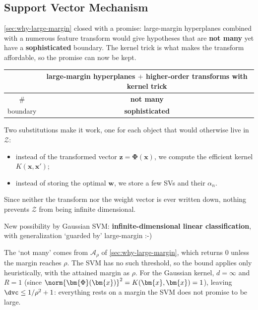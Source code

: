 \subsection{Support Vector Mechanism}

\autoref{sec:why-large-margin} closed with a promise: large-margin
hyperplanes combined with a numerous feature transform would give
hypotheses that are \textbf{not many} yet have a \textbf{sophisticated}
boundary. The kernel trick is what makes the transform affordable, so the
promise can now be kept.

\begin{center}
    \solidrules
    \begin{tabular}{c|c}
        \toprule
        & large-margin hyperplanes \(+\) higher-order transforms with
            kernel trick\\
        \midrule
        \# & \textbf{not many}\\
        boundary & \textbf{sophisticated}\\
        \bottomrule
    \end{tabular}
\end{center}

Two substitutions make it work, one for each object that would otherwise
live in \(\mathcal{Z}\):
\begin{itemize}
    \item instead of the transformed vector \(\bm{z} = \bm{\Phi}(\bm{x})\),
        we compute the efficient kernel \(K(\bm{x}, \bm{x}')\);
    \item instead of storing the optimal \(\bm{w}\), we store a few SVs and
        their \(\alpha_n\).
\end{itemize}
Since neither the transform nor the weight vector is ever written down,
nothing prevents \(\mathcal{Z}\) from being infinite dimensional.

\begin{moral}
    New possibility by Gaussian SVM: \textbf{infinite-dimensional linear
    classification}, with generalization `guarded by' large-margin :-)
\end{moral}

\begin{remark}
    The `not many' comes from \(\mathcal{A}_\rho\) of
    \autoref{sec:why-large-margin}, which returns \(0\) unless the margin
    reaches \(\rho\). The SVM has no such threshold, so the bound applies
    only heuristically, with the attained margin as \(\rho\). For the
    Gaussian kernel, \(d = \infty\) and \(R = 1\) (since
    \(\norm{\bm{\Phi}(\bm{x})}^2 = K(\bm{x}, \bm{x}) = 1\)), leaving
    \(\dvc \le 1/\rho^2 + 1\): everything rests on a margin the SVM does not
    promise to be large.
\end{remark}

